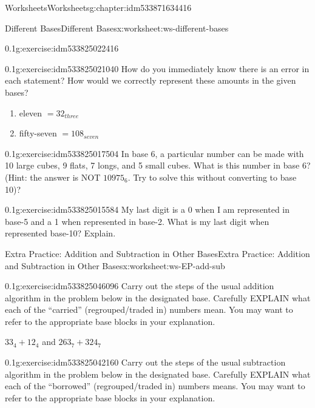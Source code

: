 \documentclass[twoside,11pt,]{book}
\begin{document}
\begin{chapterptx}{Worksheets}{}{Worksheets}{}{}{g:chapter:idm533871634416}
\begin{worksheet-section-numberless}{Different Bases}{}{Different Bases}{}{}{x:worksheet:ws-different-bases}
\begin{divisionexercise}{4}{}{0.1}{g:exercise:idm533825022416}
\end{divisionexercise}%
\begin{divisionexercise}{5}{}{0.1}{g:exercise:idm533825021040}%
How do you immediately know there is an error in each statement?  How would we correctly represent these amounts in the given bases?%
%
\begin{enumerate}[label=(\alph*)]
\item{}eleven \(= 32_{three}\)%
\item{}fifty-seven \(= 108_{seven}\)%
\end{enumerate}
\end{divisionexercise}%
\begin{divisionexercise}{6}{}{0.1}{g:exercise:idm533825017504}%
In base 6, a particular number can be made with 10 large cubes, 9 flats, 7 longs, and 5 small cubes.  What is this number in base 6? (Hint: the answer is NOT \(10975_6 \). Try to solve this without converting to base 10)?%
\end{divisionexercise}%
\begin{divisionexercise}{7}{}{0.1}{g:exercise:idm533825015584}%
My last digit is a 0 when I am represented in base-5 and a 1 when represented in base-2.  What is my last digit when represented base-10? Explain.%
\end{divisionexercise}%
\end{worksheet-section-numberless}
\restoregeometry
%
%
\typeout{************************************************}
\typeout{************************************************}
%
\begin{worksheet-section-numberless}{Extra Practice: Addition and Subtraction in Other Bases}{}{Extra Practice: Addition and Subtraction in Other Bases}{}{}{x:worksheet:ws-EP-add-sub}
\begin{divisionexercise}{1}{}{0.1}{g:exercise:idm533825046096}%
Carry out the steps of the usual addition algorithm in the problem below in the designated base.  Carefully EXPLAIN what each of the “carried” (regrouped\slash{}traded in) numbers mean.  You may want to refer to the appropriate base blocks in your explanation.%
\par
\(33_4+12_4\) and \(263_7+324_7\)%
\end{divisionexercise}%
\begin{divisionexercise}{2}{}{0.1}{g:exercise:idm533825042160}%
Carry out the steps of the usual subtraction algorithm in the problem below in the designated base.  Carefully EXPLAIN what each of the “borrowed” (regrouped\slash{}traded in) numbers means.  You may want to refer to the appropriate base blocks in your explanation.%

\end{divisionexercise}
\end{worksheet-section-numberless}
\end{chapterptx}
\end{document}
